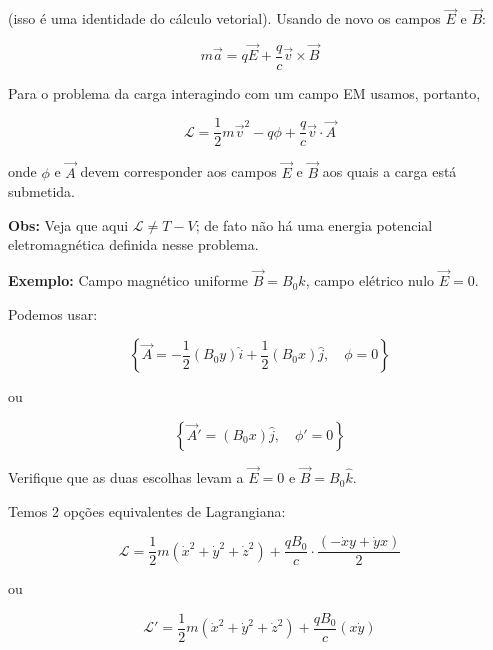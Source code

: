 (isso é uma identidade do cálculo vetorial). Usando de novo os campos $\vec{E}$ e $\vec{B}$:

\begin{equation}
m\vec{a} = q\vec{E} + \frac{q}{c}\vec{v}\times\vec{B}
\label{eq:aula8_lorentz_recuperada}
\end{equation}

Para o problema da carga interagindo com um campo EM usamos, portanto,

\begin{equation}
\boxed{\mathcal{L} = \frac{1}{2} m \vec{v}^2 - q\phi + \frac{q}{c}\vec{v}\cdot\vec{A}}
\label{eq:aula8_lagrangiana_em_final}
\end{equation}

onde $\phi$ e $\vec{A}$ devem corresponder aos campos $\vec{E}$ e $\vec{B}$ aos quais a carga está submetida.

\textbf{Obs:} Veja que aqui $\mathcal{L} \neq T - V$; de fato não há uma energia potencial eletromagnética definida nesse problema.

\textbf{Exemplo:} Campo magnético uniforme $\vec{B} = B_0\hat{k}$, campo elétrico nulo $\vec{E} = 0$.

Podemos usar:

\begin{equation}
\left\{\vec{A} = -\frac{1}{2}(B_0 y)\hat{i} + \frac{1}{2}(B_0 x)\hat{j}, \quad \phi = 0\right\}
\label{eq:aula8_gauge_simetrico}
\end{equation}

ou

\begin{equation}
\left\{\vec{A}' = (B_0 x)\hat{j}, \quad \phi' = 0\right\}
\label{eq:aula8_gauge_landau}
\end{equation}

Verifique que as duas escolhas levam a $\vec{E} = 0$ e $\vec{B} = B_0\hat{k}$.

Temos 2 opções equivalentes de Lagrangiana:

\begin{equation}
\mathcal{L} = \frac{1}{2} m(\dot{x}^2 + \dot{y}^2 + \dot{z}^2) + \frac{qB_0}{c}\cdot\frac{(-\dot{x}y + \dot{y}x)}{2}
\label{eq:aula8_lagrangiana_simetrica}
\end{equation}

ou

\begin{equation}
\mathcal{L}' = \frac{1}{2} m(\dot{x}^2 + \dot{y}^2 + \dot{z}^2) + \frac{qB_0}{c}(x\dot{y})
\label{eq:aula8_lagrangiana_landau}
\end{equation}

